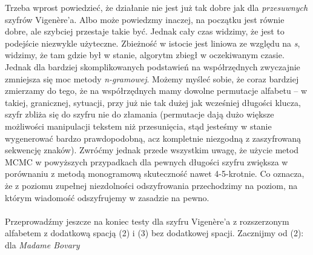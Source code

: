 \documentclass[a4paper]{article}
\theoremstyle{defn}
\theoremstyle{theorem}
\theoremstyle{lemma}
\theoremstyle{cor}
\theoremstyle{fact}
\begin{document}
Trzeba wprost powiedzieć, że działanie nie jest już tak dobre jak dla \textit{przesuwnych} szyfrów Vigenère'a. Albo może powiedzmy inaczej, na początku jest równie dobre, ale szybciej przestaje takie być. Jednak cały czas widzimy, że jest to podejście niezwykle użyteczne. Zbieżność w istocie jest liniowa ze względu na \textit{s}, widzimy, że tam gdzie był w stanie, algorytm zbiegł w oczekiwanym czasie. Jednak dla bardziej skomplikowanych podstawień na współrzędnych zwyczajnie zmniejsza się moc metody \textit{n-gramowej}. Możemy myśleć sobie, że coraz bardziej zmierzamy do tego, że na współrzędnych mamy dowolne permutacje alfabetu – w takiej, granicznej, sytuacji, przy już nie tak dużej jak wcześniej długości klucza, szyfr zbliża się do szyfru nie do złamania (permutacje dają dużo większe możliwości manipulacji tekstem niż przesunięcia, stąd jesteśmy w stanie wygenerować bardzo prawdopodobną, acz kompletnie niezgodną z zaszyfrowaną sekwencję znaków). Zwróćmy jednak przede wszystkim uwagę, że użycie metod MCMC w powyższych przypadkach dla pewnych długości szyfru zwiększa w porównaniu z metodą monogramową skuteczność nawet 4-5-krotnie. Co oznacza, że z poziomu zupełnej niezdolności odszyfrowania przechodzimy na poziom, na którym wiadomość odszyfrujemy w zasadzie na pewno.\\\\
Przeprowadźmy jeszcze na koniec testy dla szyfru Vigenère'a z rozszerzonym alfabetem z dodatkową spacją (2) i (3) bez dodatkowej spacji. Zacznijmy od (2): dla \textit{Madame Bovary}
\end{document}
